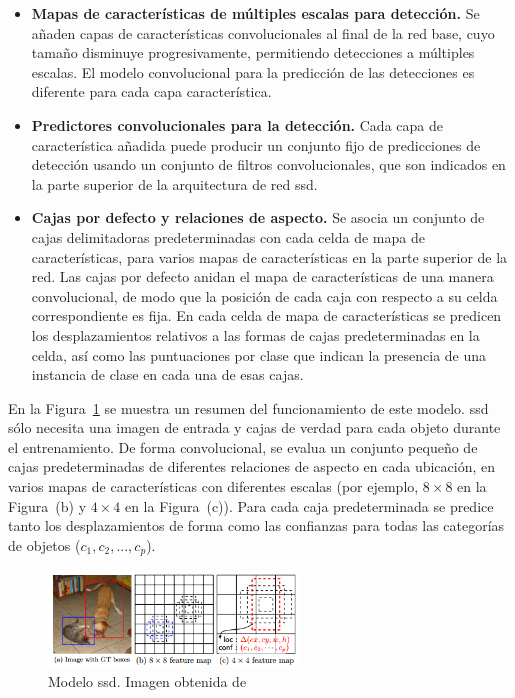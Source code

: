 \begin{itemize}
	\item \textbf{Mapas de características de múltiples escalas para detección.} Se añaden capas de características convolucionales al final de la red base, cuyo tamaño disminuye progresivamente, permitiendo detecciones a múltiples escalas. El modelo convolucional para la predicción de las detecciones es diferente para cada capa característica.
	\vspace{10pt}
	\item \textbf{Predictores convolucionales para la detección.} Cada capa de característica añadida puede producir un conjunto fijo de predicciones de detección usando un conjunto de filtros convolucionales, que son indicados en la parte superior de la arquitectura de red \acrshort{ssd}.
	\item \textbf{Cajas por defecto y relaciones de aspecto.} Se asocia un conjunto de cajas delimitadoras predeterminadas con cada celda de mapa de características, para varios mapas de características en la parte superior de la red. Las cajas por defecto anidan el mapa de características de una manera convolucional, de modo que la posición de cada caja con respecto a su celda correspondiente es fija. En cada celda de mapa de características se predicen los desplazamientos relativos a las formas de cajas predeterminadas en la celda, así como las puntuaciones por clase que indican la presencia de una instancia de clase en cada una de esas cajas.
\end{itemize}

En la Figura~\ref{fig.ssd} se muestra un resumen del funcionamiento de este modelo. \acrshort{ssd} sólo necesita una imagen de entrada y cajas de verdad para cada objeto durante el entrenamiento. De forma convolucional, se evalua un conjunto pequeño de cajas predeterminadas de diferentes relaciones de aspecto en cada ubicación, en varios mapas de características con diferentes escalas (por ejemplo, $8\times8$ en la Figura~(b) y $4\times4$ en la Figura~(c)). Para cada caja predeterminada se predice tanto los desplazamientos de forma como las confianzas para todas las categorías de objetos ($c_1, c_2, ... , c_p$).

\begin{figure}[H]
	\begin{center}
		\includegraphics[width=0.6\textwidth]{figures/ssd}
		\caption{Modelo \acrshort{ssd}. Imagen obtenida de~\cite{2015arXiv151202325L}}
		\label{fig.ssd}
	\end{center}
\end{figure} 

